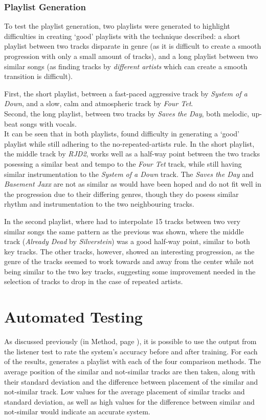 \subsubsection{Playlist Generation}
To test the playlist generation, two playlists were generated to highlight difficulties in creating `good' playlists with the technique described: a short playlist between two tracks disparate in genre (as it is difficult to create a smooth progression with only a small amount of tracks), and a long playlist between two similar songs (as finding tracks by \emph{different artists} which can create a smooth transition is difficult).

First, the short playlist, between a fast-paced aggressive track by \emph{System of a Down}, and a slow, calm and atmospheric track by \emph{Four Tet}.\\

Second, the long playlist, between two tracks by \emph{Saves the Day}, both melodic, up-beat songs with vocals.\\

It can be seen that in both playlists,  found difficulty in generating a `good' playlist while still adhering to the no-repeated-artists rule. In the short playlist, the middle track by \emph{RJD2}, works well as a half-way point between the two tracks posessing a similar beat and tempo to the \emph{Four Tet} track, while still having similar instrumentation to the \emph{System of a Down} track. The \emph{Saves the Day} and \emph{Basement Jaxx} are not as similar as would have been hoped and do not fit well in the progression due to their differing genres, though they do posess similar rhythm and instrumentation to the two neighbouring tracks.

In the second playlist, where  had to interpolate 15 tracks between two very similar songs the same pattern as the previous was shown, where the middle track (\emph{Already Dead} by \emph{Silverstein}) was a good half-way point, similar to both key tracks. The other tracks, however, showed an interesting progression, as the genre of the tracks seemed to work towards and away from the center while not being similar to the two key tracks, suggesting some improvement needed in the selection of tracks to drop in the case of repeated artists.
\pagebreak
\section{Automated Testing}
As discussed previously (in Method, page \pageref{text:method:weight_optimisation}), it is possible to use the output from the listener test to rate the system's accuracy before and after training. For each of the results,  generates a playlist with each of the four comparison methods. The average position of the similar and not-similar tracks are then taken, along with their standard deviation and the difference between placement of the similar and not-similar track. Low values for the average placement of similar tracks and standard deviation, as well as high values for the difference between similar and not-similar would indicate an accurate system.
